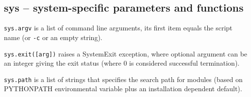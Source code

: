 %

\subsection{sys -- system-specific parameters and functions}

\texttt{sys.argv} is a list of command line arguments, its first item equals the script name (or \texttt{-c} or an empty string).

\texttt{sys.exit([arg])} raises a SystemExit exception, where optional argument can be an integer giving the exit status (where 0 is considered successful termination).

\texttt{sys.path} is a list of strings that specifies the search path for modules (based on PYTHONPATH environmental variable plus an installation dependent default).

%
